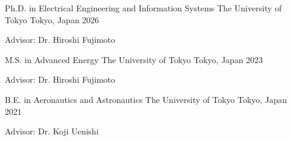

\begin{cventries}

  \cventry
    {Ph.D. in Electrical Engineering and Information Systems} %
    {The University of Tokyo} %
    {Tokyo, Japan} %
    {2026} %
    {
      \begin{cvitems} %
        \item {Advisor: Dr. Hiroshi Fujimoto}
      \end{cvitems}
    }

  \cventry
    {M.S. in Advanced Energy} %
    {The University of Tokyo} %
    {Tokyo, Japan} %
    {2023} %
    {
      \begin{cvitems} %
        \item {Advisor: Dr. Hiroshi Fujimoto}
      \end{cvitems}
    }

  \cventry
    {B.E. in Aeronautics and Astronautics} %
    {The University of Tokyo} %
    {Tokyo, Japan} %
    {2021} %
    {
      \begin{cvitems} %
        \item {Advisor: Dr. Koji Uenishi}
      \end{cvitems}
    }

\end{cventries}
